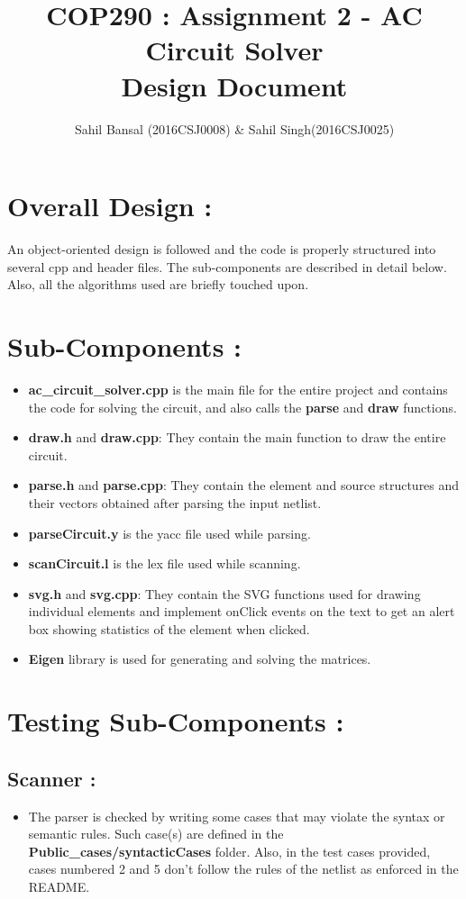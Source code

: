 \documentclass[]{article}
\title{\textbf{COP290 : Assignment 2 - AC Circuit Solver \\ Design Document}}
\author{Sahil Bansal (2016CSJ0008) \& Sahil Singh(2016CSJ0025)}
\begin{document}
\maketitle

\section{\LARGE Overall Design :}
\Large
An object-oriented design is followed and the code is properly structured into several cpp and header files. The sub-components are described in detail below. Also, all the algorithms used are briefly touched upon.

\section{\LARGE Sub-Components :}
\begin{itemize}
	\item \textbf{ac\_circuit\_solver.cpp} is the main file for the entire project and contains the code for solving the circuit, and also calls the \textbf{parse} and \textbf{draw} functions.
	\item \textbf{draw.h} and \textbf{draw.cpp}: They contain the main function to draw the entire circuit.
	\item \textbf{parse.h} and \textbf{parse.cpp}: They contain the element and source structures and their vectors obtained after parsing the input netlist.
	\item \textbf{parseCircuit.y} is the yacc file used while parsing.
	\item \textbf{scanCircuit.l} is the lex file used while scanning.
	\item \textbf{svg.h} and \textbf{svg.cpp}: They contain the SVG functions used for drawing individual elements and implement onClick events on the text to get an alert box showing statistics of the element when clicked. 
	\item \textbf{Eigen} library is used for generating and solving the matrices. 
\end{itemize}

\section{\LARGE Testing Sub-Components :}
\subsection{Scanner :}
\Large 
\begin{itemize}
	\item The parser is checked by writing some cases that may violate the syntax or semantic rules. Such case(s) are defined in the \textbf{Public\_cases/syntacticCases} folder. Also, in the test cases provided, cases numbered 2 and 5 don't follow the rules of the netlist as enforced in the README. 
	 \end{itemize}
 
\end{document}
